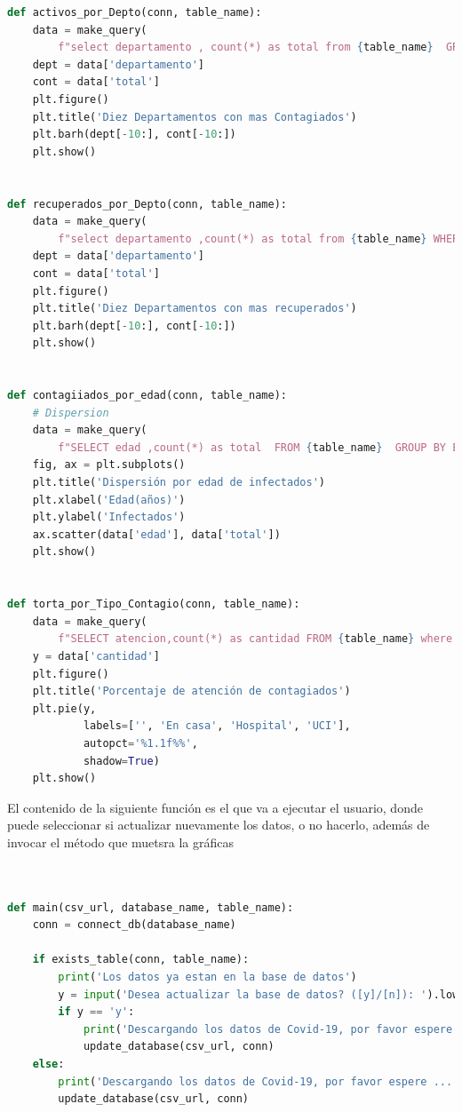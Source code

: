 \documentclass[conference,compsoc,onecolumn]{IEEEtran}
\begin{document}
\begin{itemize}
\begin{lstlisting}[language=python, caption=Funciones que muestran las estadísticas del Covid-19, captionpos=b, label=lst:SNRCode]
def activos_por_Depto(conn, table_name):
    data = make_query(
        f"select departamento , count(*) as total from {table_name}  GROUP BY departamento ORDER BY total", conn)
    dept = data['departamento']
    cont = data['total']
    plt.figure()
    plt.title('Diez Departamentos con mas Contagiados')
    plt.barh(dept[-10:], cont[-10:])
    plt.show()


def recuperados_por_Depto(conn, table_name):
    data = make_query(
        f"select departamento ,count(*) as total from {table_name} WHERE atencion='Recuperado' GROUP BY departamento ORDER BY total", conn)
    dept = data['departamento']
    cont = data['total']
    plt.figure()
    plt.title('Diez Departamentos con mas recuperados')
    plt.barh(dept[-10:], cont[-10:])
    plt.show()


def contagiiados_por_edad(conn, table_name):
    # Dispersion
    data = make_query(
        f"SELECT edad ,count(*) as total  FROM {table_name}  GROUP BY Edad", conn)
    fig, ax = plt.subplots()
    plt.title('Dispersión por edad de infectados')
    plt.xlabel('Edad(años)')
    plt.ylabel('Infectados')
    ax.scatter(data['edad'], data['total'])
    plt.show()


def torta_por_Tipo_Contagio(conn, table_name):
    data = make_query(
        f"SELECT atencion,count(*) as cantidad FROM {table_name} where atencion !='Recuperado' and atencion !='Fallecido' GROUP BY atencion", conn)
    y = data['cantidad']
    plt.figure()
    plt.title('Porcentaje de atención de contagiados')
    plt.pie(y,
            labels=['', 'En casa', 'Hospital', 'UCI'],
            autopct='%1.1f%%',
            shadow=True)
    plt.show()
      \end{lstlisting}

             \singlespacing 
El contenido de la siguiente función es el que va a ejecutar el usuario, donde puede seleccionar si actualizar nuevamente los datos, o no hacerlo, además de invocar el método que muetsra la gráficas
        \begin{lstlisting}[language=python, caption=Funcion main del programa, captionpos=b, label=lst:SNRCode]


def main(csv_url, database_name, table_name):
    conn = connect_db(database_name)

    if exists_table(conn, table_name):
        print('Los datos ya estan en la base de datos')
        y = input('Desea actualizar la base de datos? ([y]/[n]): ').lower()
        if y == 'y':
            print('Descargando los datos de Covid-19, por favor espere ...')
            update_database(csv_url, conn)
    else:
        print('Descargando los datos de Covid-19, por favor espere ...')
        update_database(csv_url, conn)


\end{lstlisting}
\end{itemize}
\end{document}
